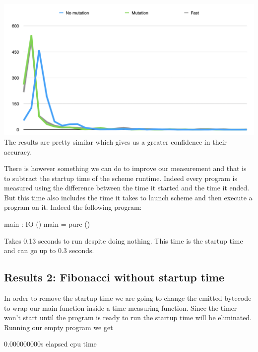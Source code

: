 \documentclass[
]{article}
\newenvironment{Shaded}{}{}
\newcommand{\DataTypeTok}[1]{\textcolor[rgb]{0.56,0.13,0.00}{#1}}
\newcommand{\FloatTok}[1]{\textcolor[rgb]{0.25,0.63,0.44}{#1}}
\newcommand{\FunctionTok}[1]{\textcolor[rgb]{0.02,0.16,0.49}{#1}}
\newcommand{\NormalTok}[1]{#1}
\newcommand{\OperatorTok}[1]{\textcolor[rgb]{0.40,0.40,0.40}{#1}}
\newcommand{\OtherTok}[1]{\textcolor[rgb]{0.00,0.44,0.13}{#1}}
\begin{document}
\includegraphics{Screenshot 2020-08-25 at 18.00.17.png} The results are
pretty similar which gives us a greater confidence in their accuracy.

There is however something we can do to improve our measurement and that
is to subtract the startup time of the scheme runtime. Indeed every
program is measured using the difference between the time it started and
the time it ended. But this time also includes the time it takes to
launch scheme and then execute a program on it. Indeed the following
program:

\begin{Shaded}
\begin{Highlighting}[]
\NormalTok{main }\OperatorTok{:} \DataTypeTok{IO}\NormalTok{ ()}
\NormalTok{main }\OtherTok{=} \FunctionTok{pure}\NormalTok{ ()}
\end{Highlighting}
\end{Shaded}

Takes 0.13 seconds to run despite doing nothing. This time is the
startup time and can go up to 0.3 seconds.

\hypertarget{results-2-fibonacci-without-startup-time}{%
\subsection{Results 2: Fibonacci without startup
time}\label{results-2-fibonacci-without-startup-time}}

In order to remove the startup time we are going to change the emitted
bytecode to wrap our main function inside a time-measuring function.
Since the timer won't start until the program is ready to run the
startup time will be eliminated. Running our empty program we get

\begin{Shaded}
\begin{Highlighting}[]
\FloatTok{0.000000000}\NormalTok{s elapsed cpu time}
\end{Highlighting}
\end{Shaded}
\end{document}
